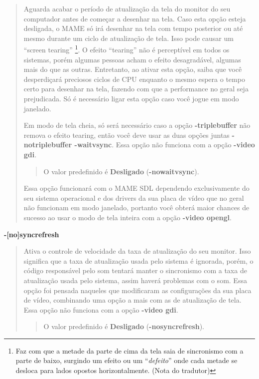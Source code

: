 \documentclass[letterpaper,10pt,brazil]{sphinxmanual}
\begin{document}
\begin{quote}

Aguarda acabar o período de atualização da tela do monitor do seu
computador antes de começar a desenhar na tela. Caso esta opção
esteja desligada, o MAME só irá desenhar na tela com tempo
posterior ou até mesmo durante um ciclo de atualização de tela. Isso
pode causar um ``screen tearing'' \footnote[6]{\sphinxAtStartFootnote%
Faz com que a metade da parte de cima da tela saia de
sincronismo com a parte de baixo, surgindo um efeito ou
um ``\emph{defeito}'' onde cada metade se desloca para lados opostos
horizontalmente. (Nota do tradutor)
}.
O efeito ``tearing'' não é perceptível em todos os sistemas, porém
algumas pessoas acham o efeito desagradável, algumas mais do que as
outras.
Entretanto, ao ativar esta opção, saiba que você desperdiçará
preciosos ciclos de CPU enquanto o mesmo espera o tempo certo para
desenhar na tela, fazendo com que a performance no geral seja
prejudicada.
Só é necessário ligar esta opção caso você jogue em modo janelado.

Em modo de tela cheia, só será necessário caso a opção
\textbf{-triplebuffer} não remova o efeito tearing, então você deve usar
as duas opções juntas \textbf{-notriplebuffer -waitvsync}. Essa opção não
funciona com a opção \textbf{-video gdi}.
\begin{quote}

O valor predefinido é \textbf{Desligado} (\textbf{-nowaitvsync}).
\end{quote}

Essa opção funcionará com o MAME SDL dependendo exclusivamente do
seu sistema operacional e dos drivers da sua placa de vídeo que no
geral não funcionam em modo janelado, portanto você obterá maior
chances de sucesso ao usar o modo de tela inteira com a opção
\textbf{-video opengl}.
\end{quote}
\label{commandline/commandline-all:mame-commandline-syncrefresh}
\textbf{-{[}no{]}syncrefresh}
\begin{quote}

Ativa o controle de velocidade da taxa de atualização do seu
monitor. Isso significa que a taxa de atualização usada pelo sistema
é ignorada, porém, o código responsável pelo som tentará manter o
sincronismo com a taxa de atualização usada pelo sistema, assim
haverá problemas com o som. Essa opção foi pensada naqueles que
modificaram as configurações da sua placa de vídeo, combinando uma
opção a mais com as de atualização de tela.
Essa opção não funciona com a opção \textbf{-video gdi}.
\begin{quote}

O valor predefinido é \textbf{Desligado} (\textbf{-nosyncrefresh}).
\end{quote}
\end{quote}
\end{document}
